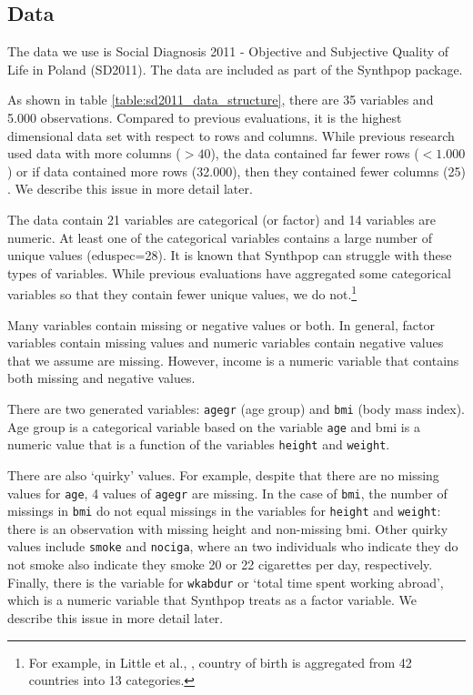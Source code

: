 \documentclass[runningheads]{llncs}
\begin{document}
\subsection{Data}

The data we use is Social Diagnosis 2011 - Objective and Subjective Quality of Life in Poland (SD2011).  The data are included as part of the Synthpop package.  

As shown in table \ref{table:sd2011_data_structure}, there are 35 variables and 5.000 observations.  Compared to previous evaluations, it is the highest dimensional data set with respect to rows and columns.  While previous research used data with more columns ($> 40$), the data contained far fewer rows ($< 1.000$) \cite{dankar2021fake} or if data contained more rows (32.000), then they contained fewer columns (25) \cite{little2022comparing}.  We describe this issue in more detail later.

The data contain 21 variables are categorical (or factor) and 14 variables are numeric.  At least one of the categorical variables contains a large number of unique values (eduspec=28).  It is known that Synthpop can struggle with these types of variables.  While previous evaluations have aggregated some categorical variables so that they contain fewer unique values, we do not.\footnote{For example, in Little et al., \cite{little2021generative}, country of birth is aggregated from 42 countries into 13 categories.}

Many variables contain missing or negative values or both.  In general, factor variables contain missing values and numeric variables contain negative values that we assume are missing.  However, income is a numeric variable that contains both missing and negative values.  

There are two generated variables: \texttt{agegr} (age group) and \texttt{bmi} (body mass index).  Age group is a categorical variable based on the variable \texttt{age} and bmi is a numeric value that is a function of the variables \texttt{height} and \texttt{weight}.  

There are also `quirky' values.  For example, despite that there are no missing values for \texttt{age}, 4 values of \texttt{agegr} are missing.  In the case of \texttt{bmi}, the number of missings in \texttt{bmi} do not equal missings in the variables for \texttt{height} and \texttt{weight}: there is an observation with missing height and non-missing bmi.  Other quirky values include \texttt{smoke} and \texttt{nociga}, where an two individuals who indicate they do not smoke also indicate they smoke 20 or 22 cigarettes per day, respectively.  Finally, there is the variable for \texttt{wkabdur} or `total time spent working abroad', which is a numeric variable that Synthpop treats as a factor variable.  We describe this issue in more detail later.
\end{document}
